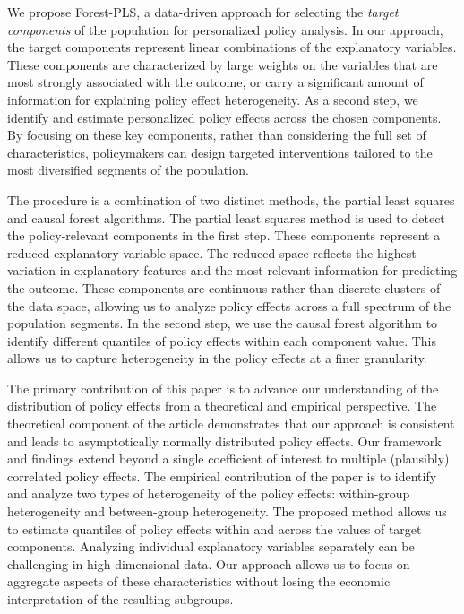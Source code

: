 \documentclass[12pt]{article}
\begin{document}
We propose Forest-PLS, a data-driven approach for selecting the  \textit{target components} of the population for personalized policy analysis. In our approach, the target components represent linear combinations of the explanatory variables. These components are characterized by large weights on the variables that are most strongly associated with the outcome, or carry a significant amount of information for explaining policy effect heterogeneity.  As a second step, we identify and estimate personalized policy effects across the chosen components. By focusing on these key components, rather than considering the full set of characteristics,  policymakers can design targeted interventions tailored to the most diversified segments of the population. 


The procedure is a combination of two distinct methods, the partial least squares  \citep{geladi1986partial, vinzi2010handbook} and causal forest \citep{athey2016recursive, wager2018estimation} algorithms. The partial least squares method is used to detect the policy-relevant components in the first step. These components represent a reduced explanatory variable space. The reduced space reflects the highest variation in explanatory features and the most relevant information for predicting the outcome. These components are continuous rather than discrete clusters of the data space, allowing us to analyze policy effects across a full spectrum of the population segments. In the second step, we use the causal forest algorithm to identify different quantiles of policy effects within each component value. This allows us to capture heterogeneity in the policy effects at a finer granularity. 



The primary contribution of this paper is to advance our understanding of the distribution of policy effects from a theoretical and empirical perspective. The theoretical component of the article demonstrates that our approach is consistent and leads to asymptotically normally distributed policy effects. Our framework and findings extend beyond a single coefficient of interest \citep{wager2018estimation} to multiple (plausibly) correlated policy effects. The empirical contribution of the paper is to identify and analyze two types of heterogeneity of the policy effects: within-group heterogeneity and between-group heterogeneity. The proposed method allows us to estimate quantiles of policy effects within and across the values of target components. Analyzing individual explanatory variables separately \citep{meinshausen2006quantile} can be challenging in high-dimensional data. Our approach allows us to focus on aggregate aspects of these characteristics without losing the economic interpretation of the resulting subgroups. 
\end{document}
